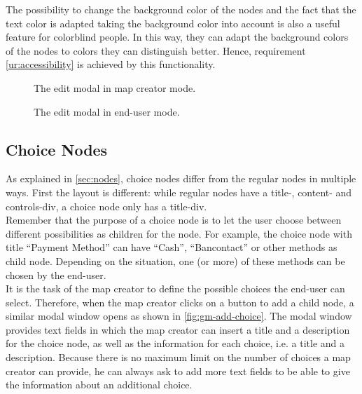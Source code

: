 The possibility to change the background color of the nodes and the fact that the text color is adapted taking the background color into account is also a useful feature for colorblind people. In this way, they can adapt the background colors of the nodes to colors they can distinguish better. Hence, requirement \ref{ur:accessibility} is achieved by this functionality.

\begin{figure}[H]
	\centering
	\caption{The edit modal in map creator mode.}
	\label{fig:gm-editmodal-mapcreator}
\end{figure}

\begin{figure}[H]
	\centering
	\caption{The edit modal in end-user mode.}
	\label{fig:gm-editmodal-enduser}
\end{figure}





\subsection{Choice Nodes}
As explained in \autoref{sec:nodes}, choice nodes differ from the regular nodes in multiple ways. First the layout is different: while regular nodes have a title-, content- and controls-div, a choice node only has a title-div.\\

Remember that the purpose of a choice node is to let the user choose between different possibilities as children for the node. For example, the choice node with title ``Payment Method'' can have ``Cash'', ``Bancontact'' or other methods as child node. Depending on the situation, one (or more) of these methods can be chosen by the end-user.\\

It is the task of the map creator to define the possible choices the end-user can select. Therefore, when the map creator clicks on a button to add a child node, a similar modal window opens as shown in \autoref{fig:gm-add-choice}. The modal window provides text fields in which the map creator can insert a title and a description for the choice node, as well as the information for each choice, i.e. a title and a description. Because there is no maximum limit on the number of choices a map creator can provide, he can always ask to add more text fields to be able to give the information about an additional choice.\\

